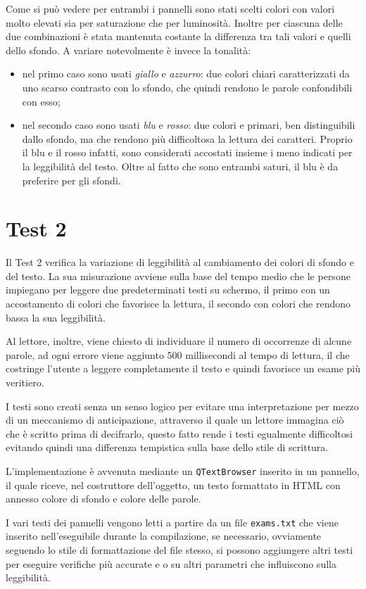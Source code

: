 \documentclass[a4paper]{article}
\begin{document}
Come si può vedere per entrambi i pannelli sono stati scelti colori con valori molto elevati sia per saturazione che per luminosità. Inoltre per ciascuna delle due combinazioni è stata mantenuta costante la differenza tra tali valori e quelli dello sfondo.
A variare notevolmente è invece la tonalità:
\begin{itemize}
\item nel primo caso sono usati \emph{giallo} e \emph{azzurro}: due colori chiari caratterizzati da uno scarso contrasto con lo sfondo, che quindi rendono le parole confondibili con esso;
\item nel secondo caso sono usati \emph{blu} e \emph{rosso}: due colori e primari, ben distinguibili dallo sfondo, ma che rendono più difficoltosa la lettura dei caratteri. Proprio il blu e il rosso infatti, sono considerati accostati insieme i meno indicati per la leggibilità del testo. Oltre al fatto che sono entrambi saturi, il blu è da preferire per gli sfondi.
\end{itemize}

\section{Test 2}
Il Test 2 verifica la variazione di leggibilità al cambiamento dei colori di sfondo e del testo.
La sua misurazione avviene sulla base del tempo medio che le persone impiegano per leggere due predeterminati testi su schermo, il primo con un accostamento 
di colori che favorisce la lettura, il secondo con colori che rendono bassa la sua leggibilità.

Al lettore, inoltre, viene chiesto di individuare il numero di occorrenze di alcune parole, ad ogni errore viene aggiunto 500 millisecondi al tempo di lettura,
il che costringe l'utente a leggere completamente il testo e quindi favorisce un esame più veritiero.

I testi sono creati senza un senso logico per evitare una interpretazione per mezzo di un meccanismo di anticipazione, attraverso il quale
un lettore immagina ciò che è scritto prima di decifrarlo, questo fatto rende i testi egualmente difficoltosi 
evitando quindi una differenza tempistica sulla base dello stile di scrittura.

L'implementazione è avvenuta mediante un \verb:QTextBrowser: inserito in un pannello, il quale riceve, nel costruttore dell'oggetto, 
un testo formattato in HTML con annesso colore di sfondo e colore delle parole.

I vari testi dei pannelli vengono letti a partire da un file \verb:exams.txt: che viene inserito nell'eseguibile durante la compilazione, se necessario, 
ovviamente seguendo lo stile di formattazione del file stesso, si possono aggiungere altri testi per eseguire verifiche più accurate e o su
altri parametri che influiscono sulla leggibilità.
\end{document}
